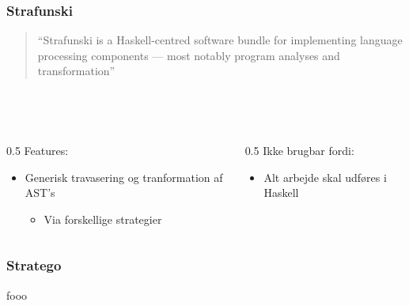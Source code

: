 \documentclass[slidestop,compress,mathserif, xcolor=dvipsnames]{beamer}
\begin{document}
\begin{frame}[c]
  \frametitle{Strafunski}

  \begin{quote}
    "`Strafunski is a Haskell-centred software bundle for implementing language
    processing components --- most notably program analyses and
    transformation"'\\ \raggedleft \cite{LV03-PADL}
  \end{quote}

  \ \\ \ \\

  \begin{columns}    
    \begin{column}{0.5\textwidth{}}
      Features:
      \begin{itemize}
      \item Generisk travasering og tranformation af AST's
        \begin{itemize}
        \item Via forskellige strategier
        \end{itemize}
      \end{itemize}
    \end{column}
    \begin{column}{0.5\textwidth{}}
      Ikke brugbar fordi:
      \begin{itemize}
      \item Alt arbejde skal udføres i Haskell
      \end{itemize}
    \end{column}

  \end{columns} 
\end{frame}


\begin{frame}[c]
  \frametitle{Stratego}

fooo

\end{frame}
\end{document}
